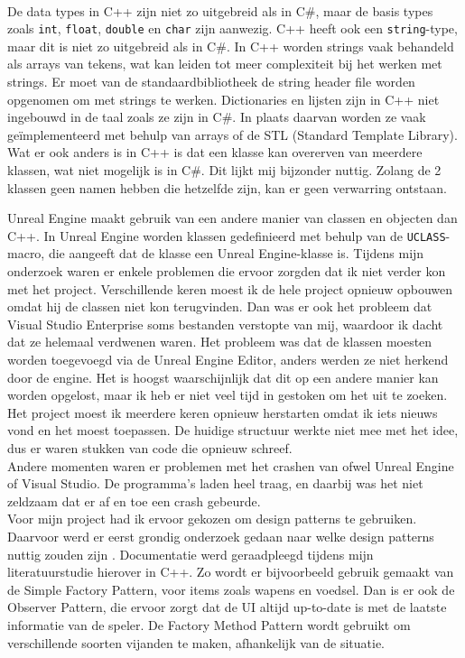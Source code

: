 \\

De data types in C++ zijn niet zo uitgebreid als in C\#, maar de basis types zoals \texttt{int}, \texttt{float}, \texttt{double} en \texttt{char} zijn aanwezig.
C++ heeft ook een \texttt{string}-type, maar dit is niet zo uitgebreid als in C\#. In C++ worden strings vaak behandeld als arrays van tekens, wat kan leiden tot meer complexiteit bij het werken met strings.
Er moet van de standaardbibliotheek de string header file worden opgenomen om met strings te werken.
Dictionaries en lijsten zijn in C++ niet ingebouwd in de taal zoals ze zijn in C\#. In plaats daarvan worden ze vaak geïmplementeerd met behulp van arrays of de STL (Standard Template Library).
\\

Wat er ook anders is in C++ is dat een klasse kan overerven van meerdere klassen, wat niet mogelijk is in C\#. Dit lijkt mij bijzonder nuttig. Zolang de 2 klassen geen namen hebben die hetzelfde zijn, kan er geen verwarring ontstaan.


Unreal Engine maakt gebruik van een andere manier van classen en objecten dan C++. In Unreal Engine worden klassen gedefinieerd met behulp van de \texttt{UCLASS}-macro, die aangeeft dat de klasse een Unreal Engine-klasse is.
Tijdens mijn onderzoek waren er enkele problemen die ervoor zorgden dat ik niet verder kon met het project.
Verschillende keren moest ik de hele project opnieuw opbouwen omdat hij de classen niet kon terugvinden.
Dan was er ook het probleem dat Visual Studio Enterprise soms bestanden verstopte van mij, waardoor ik dacht dat ze helemaal verdwenen waren.
Het probleem was dat de klassen moesten worden toegevoegd via de Unreal Engine Editor, anders werden ze niet herkend door de engine.
Het is hoogst waarschijnlijk dat dit op een andere manier kan worden opgelost, maar ik heb er niet veel tijd in gestoken om het uit te zoeken.
\\

Het project moest ik meerdere keren opnieuw herstarten omdat ik iets nieuws vond en het moest toepassen.
De huidige structuur werkte niet mee met het idee, dus er waren stukken van code die opnieuw schreef.
\\
Andere momenten waren er problemen met het crashen van ofwel Unreal Engine of Visual Studio.
De programma's laden heel traag, en daarbij was het niet zeldzaam dat er af en toe een crash gebeurde.
\\

Voor mijn project had ik ervoor gekozen om design patterns te gebruiken.
Daarvoor werd er eerst grondig onderzoek gedaan naar welke design patterns nuttig zouden zijn .
Documentatie werd geraadpleegd tijdens mijn literatuurstudie hierover in C++.
Zo wordt er bijvoorbeeld gebruik gemaakt van de Simple Factory Pattern, voor items zoals wapens en voedsel.
Dan is er ook de Observer Pattern, die ervoor zorgt dat de UI altijd up-to-date is met de laatste informatie van de speler.
De Factory Method Pattern wordt gebruikt om verschillende soorten vijanden te maken, afhankelijk van de situatie.

